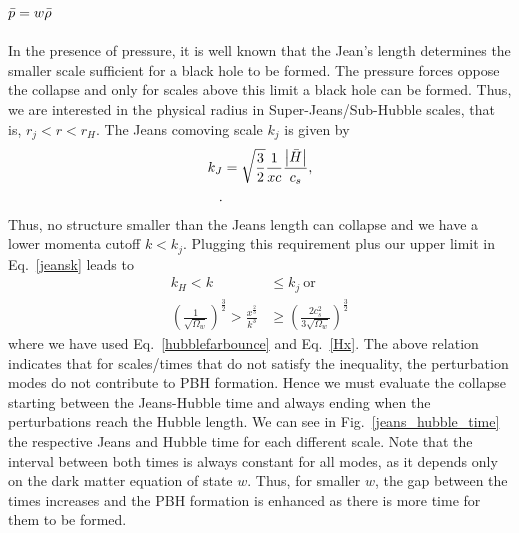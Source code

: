 \documentclass[a4paper,11pt]{article}
\begin{document}
\subsection{$\Bar{p} = w \bar{\rho}$}

 In the presence of pressure, it is well known that the Jean's length determines the smaller scale sufficient for a black hole to be formed. The pressure forces oppose the collapse and only for scales above this limit a black hole can be formed. Thus, we are interested in the physical radius in Super-Jeans/Sub-Hubble scales, that is, $r_j<r<r_H$. The Jeans comoving scale $k_j$ is given by~\cite{Quintin2016} 
\begin{align}
\label{jeansk}
k_J &= \sqrt{\frac{3}{2}}\frac{1}{xc} \frac{\abs{\Bar{H}}}{c_s},\\
.\end{align}
Thus, no structure smaller than the Jeans length can collapse and we have a lower momenta cutoff $k<k_j$. Plugging this requirement plus our upper limit in Eq.~\eqref{jeansk} leads to
\begin{align}
\label{jeanslimit}
    k_H<k&\leq k_j~\text{or}\nonumber \\
    \left(\frac{1}{\sqrt{\Omega_w}}\right)^{\frac{3}{2}}>\frac{x^{\frac{2}{3}}}{k^3} &\geq \left(\frac{2c_s^2}{3\sqrt{\Omega_w}}\right)^{\frac{3}{2}}
\end{align}
where we have used Eq.~\eqref{hubblefarbounce} and Eq.~\eqref{Hx}. The above relation indicates that for scales/times that do not satisfy the inequality, the perturbation modes do not contribute to PBH formation. Hence we must evaluate the collapse starting between the Jeans-Hubble time and always ending when the perturbations reach the Hubble length. We can see in Fig.~\ref{jeans_hubble_time} the respective Jeans and Hubble time for each different scale. Note that the interval between both times is always constant for all modes, as it depends only on the dark matter equation of state $w$. Thus, for smaller $w$, the gap between the times increases and the PBH formation is enhanced as there is more time for them to be formed.
\end{document}
